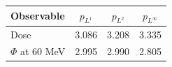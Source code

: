 \begin{tabular}{lccc}
\toprule
Observable & $p_{L^1}$ & $p_{L^2}$ & $p_{L^\infty}$ \\
\midrule
Dose & 3.086 & 3.208 & 3.335 \\
$\Phi$ at 60 MeV & 2.995 & 2.990 & 2.805 \\
\bottomrule
\end{tabular}
